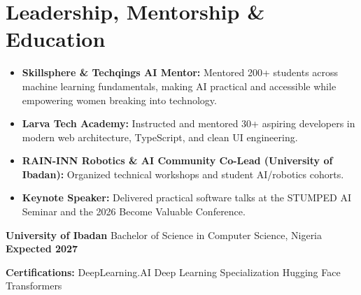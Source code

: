 \documentclass[10pt,letterpaper]{article}
\newcommand{\resumeItem}[1]{\item #1}
\begin{document}
\section{Leadership, Mentorship \& Education}

\begin{itemize}
\resumeItem{\textbf{Skillsphere \& Techqings AI Mentor:} Mentored 200+ students across machine learning fundamentals, making AI practical and accessible while empowering women breaking into technology.}
\resumeItem{\textbf{Larva Tech Academy:} Instructed and mentored 30+ aspiring developers in modern web architecture, TypeScript, and clean UI engineering.}
\resumeItem{\textbf{RAIN-INN Robotics \& AI Community Co-Lead (University of Ibadan):} Organized technical workshops and student AI/robotics cohorts.}
\resumeItem{\textbf{Keynote Speaker:} Delivered practical software talks at the STUMPED AI Seminar and the 2026 Become Valuable Conference.}
\end{itemize}

\vspace{1.5pt}
\textbf{University of Ibadan} \textbar{} Bachelor of Science in Computer Science, Nigeria \hfill \textbf{Expected 2027}\par
\textbf{Certifications:} DeepLearning.AI Deep Learning Specialization \textbar{} Hugging Face Transformers
\end{document}

